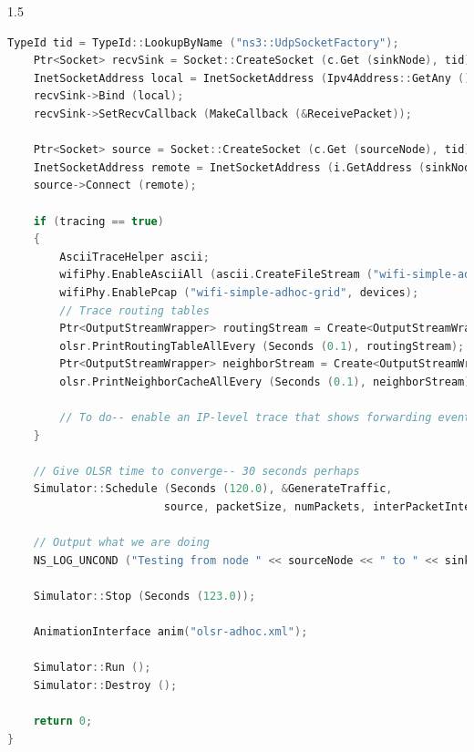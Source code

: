 \documentclass[a4paper,12pt]{report}
\begin{document}
\begin{appendix}
\begin{spacing}{1.5}
\begin{lstlisting}[language=c++]
	TypeId tid = TypeId::LookupByName ("ns3::UdpSocketFactory");
	Ptr<Socket> recvSink = Socket::CreateSocket (c.Get (sinkNode), tid);
	InetSocketAddress local = InetSocketAddress (Ipv4Address::GetAny (), 80);
	recvSink->Bind (local);
	recvSink->SetRecvCallback (MakeCallback (&ReceivePacket));

	Ptr<Socket> source = Socket::CreateSocket (c.Get (sourceNode), tid);
	InetSocketAddress remote = InetSocketAddress (i.GetAddress (sinkNode, 0), 80);
	source->Connect (remote);

	if (tracing == true)
	{
		AsciiTraceHelper ascii;
		wifiPhy.EnableAsciiAll (ascii.CreateFileStream ("wifi-simple-adhoc-grid.tr"));
		wifiPhy.EnablePcap ("wifi-simple-adhoc-grid", devices);
		// Trace routing tables
		Ptr<OutputStreamWrapper> routingStream = Create<OutputStreamWrapper> ("wifi-simple-adhoc-grid.routes", std::ios::out);
		olsr.PrintRoutingTableAllEvery (Seconds (0.1), routingStream);
		Ptr<OutputStreamWrapper> neighborStream = Create<OutputStreamWrapper> ("wifi-simple-adhoc-grid.neighbors", std::ios::out);
		olsr.PrintNeighborCacheAllEvery (Seconds (0.1), neighborStream);

		// To do-- enable an IP-level trace that shows forwarding events only
	}

	// Give OLSR time to converge-- 30 seconds perhaps
	Simulator::Schedule (Seconds (120.0), &GenerateTraffic,
						source, packetSize, numPackets, interPacketInterval);

	// Output what we are doing
	NS_LOG_UNCOND ("Testing from node " << sourceNode << " to " << sinkNode << " with grid distance " << distance);

	Simulator::Stop (Seconds (123.0));

	AnimationInterface anim("olsr-adhoc.xml");

	Simulator::Run ();
	Simulator::Destroy ();

	return 0;
}
\end{lstlisting}
\end{spacing}
\end{appendix}
		
\end{document}
